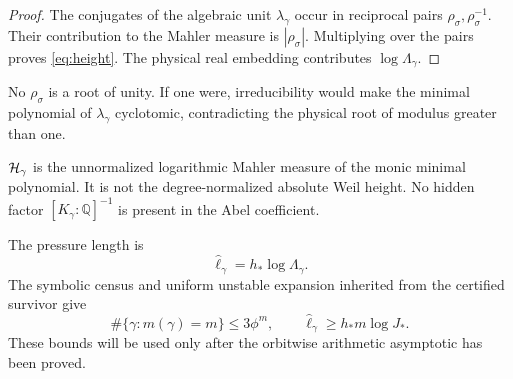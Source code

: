 \begin{proof}
The conjugates of the algebraic unit $\lambda_\gamma$ occur in reciprocal
pairs $\rho_\sigma,\rho_\sigma^{-1}$.  Their contribution to the Mahler
measure is $|\rho_\sigma|$.  Multiplying over the pairs proves
\eqref{eq:height}.  The physical real embedding contributes
$\log\Lambda_\gamma$.
\end{proof}

No $\rho_\sigma$ is a root of unity.  If one were, irreducibility would make
the minimal polynomial of $\lambda_\gamma$ cyclotomic, contradicting the
physical root of modulus greater than one.

\begin{remark}
$\mathcal H_\gamma$ is the unnormalized logarithmic Mahler measure of the monic
minimal polynomial.  It is not the degree-normalized absolute Weil height.
No hidden factor $[K_\gamma:\mathbb Q]^{-1}$ is present in the Abel
coefficient.
\end{remark}

The pressure length is
\[
 \widehat\ell_\gamma=h_*\log\Lambda_\gamma.
\]
The symbolic census and uniform unstable expansion inherited from the
certified survivor give
\begin{equation}
 \#\{\gamma:m(\gamma)=m\}\le3\phi^m,
 \qquad
 \widehat\ell_\gamma\ge h_*m\log J_*.
 \label{eq:orbit-envelope}
\end{equation}
These bounds will be used only after the orbitwise arithmetic asymptotic has
been proved.
